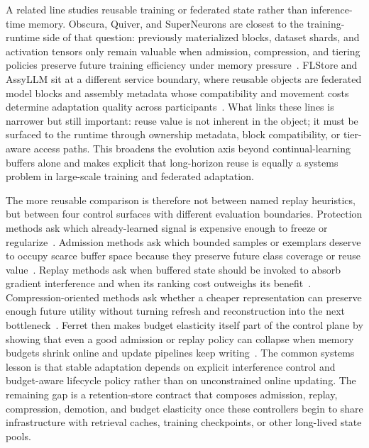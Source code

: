 \documentclass[acmsmall,screen,review]{acmart}
\begin{document}
A related line studies reusable training or federated state rather than inference-time memory. Obscura, Quiver, and SuperNeurons are closest to the training-runtime side of that question: previously materialized blocks, dataset shards, and activation tensors only remain valuable when admission, compression, and tiering policies preserve future training efficiency under memory pressure~\cite{huang2025obscura,kumar2020quiver,wang2018superneurons}. FLStore and AssyLLM sit at a different service boundary, where reusable objects are federated model blocks and assembly metadata whose compatibility and movement costs determine adaptation quality across participants~\cite{khan2025flstore,zhan2025assyllm}. What links these lines is narrower but still important: reuse value is not inherent in the object; it must be surfaced to the runtime through ownership metadata, block compatibility, or tier-aware access paths. This broadens the evolution axis beyond continual-learning buffers alone and makes explicit that long-horizon reuse is equally a systems problem in large-scale training and federated adaptation.

The more reusable comparison is therefore not between named replay heuristics, but between four control surfaces with different evaluation boundaries. Protection methods ask which already-learned signal is expensive enough to freeze or regularize~\cite{kirkpatrick2017ewc}. Admission methods ask which bounded samples or exemplars deserve to occupy scarce buffer space because they preserve future class coverage or reuse value~\cite{rebuffi2017icarl,prabhu2020gdumb,li2026streamfp}. Replay methods ask when buffered state should be invoked to absorb gradient interference and when its ranking cost outweighs its benefit~\cite{lopez2017gem,chaudhry2019agem,aljundi2019mir}. Compression-oriented methods ask whether a cheaper representation can preserve enough future utility without turning refresh and reconstruction into the next bottleneck~\cite{hayes2020remind}. Ferret then makes budget elasticity itself part of the control plane by showing that even a good admission or replay policy can collapse when memory budgets shrink online and update pipelines keep writing~\cite{zhou2025ferret}. The common systems lesson is that stable adaptation depends on explicit interference control and budget-aware lifecycle policy rather than on unconstrained online updating. The remaining gap is a retention-store contract that composes admission, replay, compression, demotion, and budget elasticity once these controllers begin to share infrastructure with retrieval caches, training checkpoints, or other long-lived state pools.
\end{document}
